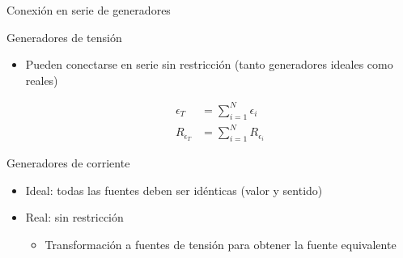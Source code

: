 \documentclass[aspectratio=169, xcolor={usenames,svgnames,dvipsnames}]{beamer}
\begin{document}

\begin{frame}{Conexión en serie de generadores}
    \begin{block}{Generadores de tensión}
    \begin{itemize}
    \item Pueden conectarse en serie \alert{sin restricción} (tanto generadores ideales como reales)

    \vspace{-5mm}
    \begin{align*}
      \epsilon_T &= \sum_{i = 1}^N \epsilon_i\\
      R_{\epsilon_T} &= \sum_{i = 1}^N R_{\epsilon_i}
    \end{align*}
    \end{itemize}
    \vspace{-3mm}
    \end{block}
    
    \begin{block}{Generadores de corriente}
    \begin{itemize}
    \vspace{2mm}
    \item \alert{Ideal}: todas las fuentes \alert{deben ser idénticas} (valor y sentido)
    \vspace{2mm}
    \item \alert{Real}:  sin restricción 
        \begin{itemize}
        \item \normalsize{Transformación a fuentes de tensión para obtener la \alert{fuente equivalente}}
        \end{itemize}
    \end{itemize}
    \end{block}
\end{frame}

\end{document}

